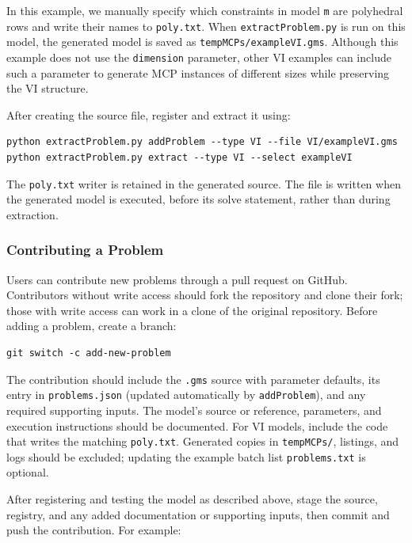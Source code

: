 In this example, we manually specify which constraints in model \texttt{m} are polyhedral rows and write their names to \texttt{poly.txt}. When \texttt{extractProblem.py} is run on this model, the generated model is saved as \texttt{tempMCPs/exampleVI.gms}. Although this example does not use the \texttt{dimension} parameter, other VI examples can include such a parameter to generate MCP instances of different sizes while preserving the VI structure.

After creating the source file, register and extract it using:

\begin{verbatim}
python extractProblem.py addProblem --type VI --file VI/exampleVI.gms
python extractProblem.py extract --type VI --select exampleVI
\end{verbatim}

The \texttt{poly.txt} writer is retained in the generated source. The file is written when the generated model is executed, before its solve statement, rather than during extraction.

\subsubsection{Contributing a Problem}

Users can contribute new problems through a pull request on GitHub. Contributors without write access should fork the repository and clone their fork; those with write access can work in a clone of the original repository. Before adding a problem, create a branch:

\begin{verbatim}
git switch -c add-new-problem
\end{verbatim}

The contribution should include the \texttt{.gms} source with parameter defaults, its entry in \texttt{problems.json} (updated automatically by \texttt{addProblem}), and any required supporting inputs. The model's source or reference, parameters, and execution instructions should be documented. For VI models, include the code that writes the matching \texttt{poly.txt}. Generated copies in \texttt{tempMCPs/}, listings, and logs should be excluded; updating the example batch list \texttt{problems.txt} is optional.

After registering and testing the model as described above, stage the source, registry, and any added documentation or supporting inputs, then commit and push the contribution. For example:

